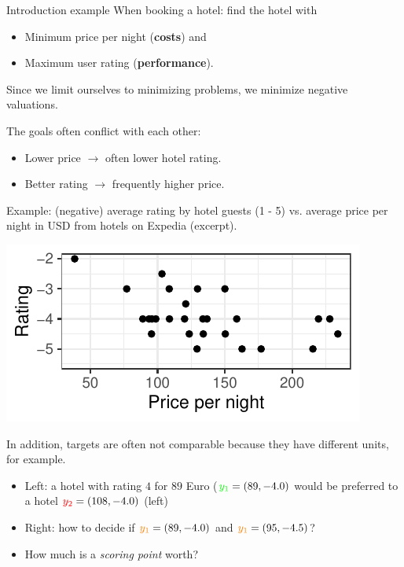 \begin{frame}[allowframebreaks]{Introduction example}
When booking a hotel: find the hotel with

\begin{itemize}
\item Minimum price per night (\textbf{costs}) and
\item Maximum user rating (\textbf{performance}).
\end{itemize}

\vfill

\begin{footnotesize}
Since we limit ourselves to minimizing problems, we minimize negative valuations.
\end{footnotesize}

\framebreak

The goals often conflict with each other:

\begin{itemize}
\item Lower price $\to$ often lower hotel rating.
\item Better rating $\to$ frequently higher price.
\end{itemize}

Example: (negative) average rating by hotel guests (1 - 5) vs. average price per night in USD from hotels on Expedia (excerpt).

\vspace*{0.2cm}

\centering \includegraphics[width=\maxwidth]{images/expedia-1-1}


In addition, targets are often not comparable because they have different units, for example.

\begin{itemize}
\item Left: a hotel with rating $4$ for $89$ Euro ($\textcolor{green}{y_1} = \left(89, - 4.0\right)$ would be preferred to a hotel $\textcolor{red}{y_2} = \left(108, - 4.0\right)$ (left)
\item Right: how to decide if $\textcolor{orange}{y_1} = \left(89, - 4.0\right)$ and $\textcolor{orange}{y_1} = \left(95, - 4.5\right)$?
\item How much is a \textit{scoring point} worth?
\end{itemize}


\end{frame}
